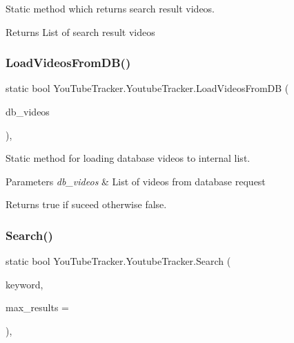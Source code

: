 Static method which returns search result videos. 

\begin{DoxyReturn}{Returns}
List of search result videos
\end{DoxyReturn}
\mbox{\label{class_you_tube_tracker_1_1_youtube_tracker_af040757c1f7db9fd8f81cf06e4ade32f}} 
\subsubsection{\texorpdfstring{Load\+Videos\+From\+D\+B()}{LoadVideosFromDB()}}
{\footnotesize\ttfamily static bool You\+Tube\+Tracker.\+Youtube\+Tracker.\+Load\+Videos\+From\+DB (\begin{DoxyParamCaption}\item[{List$<$ Data\+Base.\+D\+B\+Video $>$}]{db\+\_\+videos }\end{DoxyParamCaption})\hspace{0.3cm}{\ttfamily [inline]}, {\ttfamily [static]}}



Static method for loading database videos to internal list. 


\begin{DoxyParams}{Parameters}
{\em db\+\_\+videos} & List of videos from database request\\
\hline
\end{DoxyParams}
\begin{DoxyReturn}{Returns}
{\ttfamily true} if suceed otherwise {\ttfamily false}.
\end{DoxyReturn}
\mbox{\label{class_you_tube_tracker_1_1_youtube_tracker_a24b98848290566830b3f08b09168f4d9}} 
\subsubsection{\texorpdfstring{Search()}{Search()}}
{\footnotesize\ttfamily static bool You\+Tube\+Tracker.\+Youtube\+Tracker.\+Search (\begin{DoxyParamCaption}\item[{string}]{keyword,  }\item[{uint}]{max\+\_\+results = {} }\end{DoxyParamCaption})\hspace{0.3cm}{\ttfamily [inline]}, {\ttfamily [static]}}



